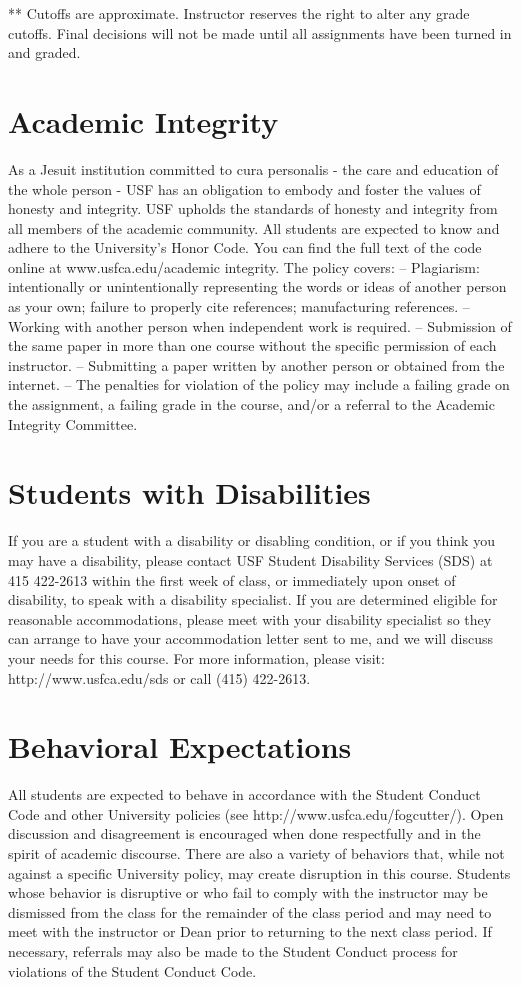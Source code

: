 \documentclass[10pt, oneside]{article}
\begin{document}
\noindent *** Cutoffs are approximate.  Instructor reserves the right to alter any grade cutoffs.  Final decisions will not be made until all assignments have been turned in and graded. 


\section*{Academic Integrity}
As a Jesuit institution committed to cura personalis - the care and education of the whole person - USF has an obligation to embody and foster the values of honesty and integrity. USF upholds the standards of honesty and integrity from all members of the academic community. All students are expected to know and adhere to the University’s Honor Code. You can find the full text of the code online at www.usfca.edu/academic integrity. The policy covers:
– Plagiarism: intentionally or unintentionally representing the words or ideas of another person as your own; failure to properly cite references; manufacturing references.
– Working with another person when independent work is required.
– Submission of the same paper in more than one course without the specific permission of each instructor.
– Submitting a paper written by another person or obtained from the internet.
– The penalties for violation of the policy may include a failing grade on the assignment, a failing grade in the course, and/or a referral to the Academic Integrity Committee.

\section*{Students with Disabilities}
If you are a student with a disability or disabling condition, or if you think you may have a disability, please contact USF Student Disability Services (SDS) at 415 422-2613 within the first week of class, or immediately upon onset of disability, to speak with a disability specialist. If you are determined eligible for reasonable accommodations, please meet with your disability specialist so they can arrange to have your accommodation letter sent to me, and we will discuss your needs for this course. For more information, please visit: http://www.usfca.edu/sds or call (415) 422-2613.

\section*{Behavioral Expectations}
All students are expected to behave in accordance with the Student Conduct Code and other University policies (see http://www.usfca.edu/fogcutter/). Open discussion and disagreement is encouraged when done respectfully and in the spirit of academic discourse. There are also a variety of behaviors that, while not against a specific University policy, may create disruption in this course. Students whose behavior is disruptive or who fail to comply with the instructor may be dismissed from the class for the remainder of the class period and may need to meet with the instructor or Dean prior to returning to the next class period. If necessary, referrals may also be made to the Student Conduct process for violations of the Student Conduct Code.
\end{document}
